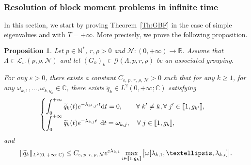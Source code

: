 \documentclass[11pt]{article}
\newtheorem{prop}[theo]{Proposition}
\theoremstyle{definition}
\numberwithin{equation}{section}
\numberwithin{figure}{section}
\numberwithin{table}{section}
\newcommand{\llbracket}{\mathopen{[\mkern -2.7mu[}}
\newcommand{\rrbracket}{\mathclose{]\mkern -2.7mu]}}
\newcommand{\inter}[2]{\llbracket #1,#2 \rrbracket}
\newcommand{\n}{g}
\newcommand{\LL}{\mathcal{L}}
\newcommand{\NN}{\mathcal{N}}
\newcommand{\N}{\mathbb{N}}
\newcommand{\R}{\mathbb{R}}
\newcommand{\C}{\mathbb{C}}
\newcommand{\md}{\mathrm{d}}
\let\oldforall\forall
\renewcommand*{\forall}{\mathrel{\oldforall}}
\begin{document}
\subsubsection{Resolution of block moment problems in infinite time} \label{sec:BBM_infinite}

In this section, we start by proving Theorem~\ref{Th:GBF} in the case of simple eigenvalues and with $T=+\infty$. More precisely, we prove the following proposition.

\begin{prop}\label{Prop:GBF_Infini}
Let $p \in \N^*$, $r, \rho > 0$ and $\NN : (0,+\infty) \to \R$. Assume that $\Lambda \in \LL_w(p,\rho, \NN)$ and let $(G_k)_k\in \mathcal{G}(\Lambda,p,r,\rho)$ be an associated grouping.

For any $\varepsilon > 0$, there exists a constant $C_{\varepsilon,\,p,\,r,\,\rho,\,\NN} >0$ such that for any $k \geq 1$, for any $\omega_{k,1}, \dots, \omega_{k, \n_k} \in \C$, there exists $\widetilde{q}_k \in L^2(0,+\infty; \C)$ satisfying
\begin{equation}\label{GBF_Infini_quelconque}
\begin{cases}
\displaystyle\int_0^{+\infty} \widetilde{q}_k(t) e^{-\lambda_{k',j'} t } \md t = 0, \mkern36mu \forall k' \neq k, \forall j' \in \inter{1}{\n_{k'}},
\\[0.15em]
\displaystyle\int_0^{+\infty} \widetilde{q}_k(t) e^{-\lambda_{k,j} t } \;\,\md t = \omega_{k,j}, \quad \forall j \in \inter{1}{\n_k},
\end{cases}
\end{equation}
and
\begin{equation*}\label{Estimee_GBF_Infini}
\| \widetilde{q}_k \|_{L^2(0,\,+\infty ;\,\C)} \leq C_{\varepsilon,\,p,\,r,\,\rho,\,\NN} e^{\varepsilon \lambda_{k,1}} \max \limits_{i\in \inter{1}{\n_k}} \big| \omega[\lambda_{k,1}, \dots, \lambda_{k,i}] \big|.
\end{equation*}
\end{prop}
\end{document}
